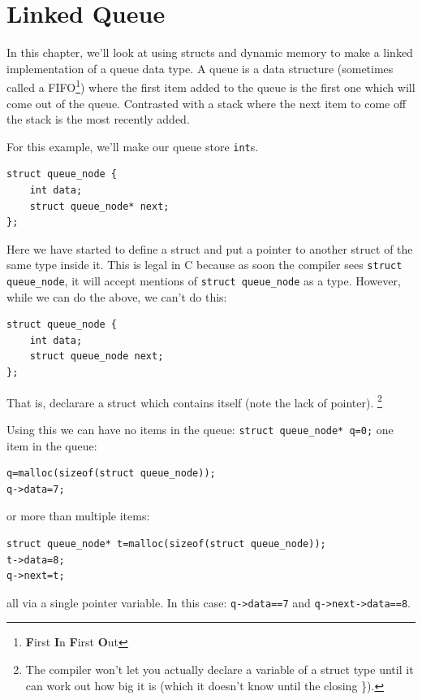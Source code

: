 
\chapter{Linked Queue}


In this chapter, we'll look at using structs and dynamic memory to make a linked implementation of a queue data type.
A queue is a data structure (sometimes called a FIFO\footnote{\textbf{F}irst \textbf{I}n \textbf{F}irst \textbf{O}ut}) 
where the first item added to the queue is the first one which will come out of the queue.
Contrasted with a stack where the next item to come off the stack is the most recently added.

For this example, we'll make our queue store \texttt{int}s.

\begin{lstlisting}
struct queue_node {
    int data;
    struct queue_node* next;
};
\end{lstlisting}

Here we have started to define a struct and put a pointer to another struct of the same type inside it.
This is legal in C because as soon the compiler sees \texttt{struct queue\_node}, it will accept mentions of \texttt{struct queue\_node}
as a type. However, while we can do the above, we can't do this:

\begin{lstlisting}
struct queue_node {
    int data;
    struct queue_node next;
};
\end{lstlisting}
That is, declarare a struct which contains itself (note the lack of pointer).
\footnote{The compiler won't let you actually declare a variable of a 
struct type until it can work out how big it is (which it doesn't know until the closing \}).}



Using this we can have no items in the queue:
\lstinline!struct queue_node* q=0;!
one item in the queue:
\begin{lstlisting}
q=malloc(sizeof(struct queue_node));
q->data=7;
\end{lstlisting}
or more than multiple items:
\begin{lstlisting}
struct queue_node* t=malloc(sizeof(struct queue_node));
t->data=8;
q->next=t;
\end{lstlisting}
all via a single pointer variable.
In this case: \lstinline!q->data==7! and \lstinline!q->next->data==8!.

